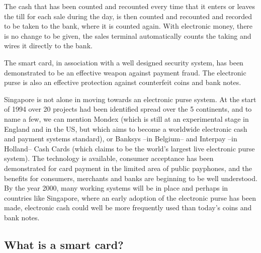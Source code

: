 \begin{htmllist}
    
    The cash that has been counted and recounted every time that it enters
    or leaves the till for each sale during the day, is then counted and
    recounted and recorded to be taken to the bank, where it is counted
    again. With electronic money, there is no change to be given, the sales
    terminal automatically counts the taking and wires it directly to the
    bank.\\

    
    The smart card, in association with a well designed security system,
    has been demonstrated to be an effective weapon against payment fraud.
    The electronic purse is also an effective protection against
    counterfeit coins and bank notes.\\

    
    Singapore is not alone in moving towards an electronic purse system. At
    the start of 1994 over 20 projects had been identified spread over the
    5 continents, and to name a few, we can mention Mondex (which is still
    at an experimental stage in England and in the US, but which aims to
    become a worldwide electronic cash and payment systems standard), or
    Banksys --in Belgium-- and Interpay --in Holland-- Cash Cards (which
    claims to be the world's largest live electronic purse system). The
    technology is available, consumer acceptance has been demonstrated for
    card payment in the limited area of public payphones, and the benefits
    for consumers, merchants and banks are beginning to be well understood.
    By the year 2000, many working systems will be in place and perhaps in
    countries like Singapore, where an early adoption of the electronic
    purse has been made, electronic cash could well be more frequently used
    than today's coins and bank notes.
\end{htmllist}

\subsection{What is a smart card?}

